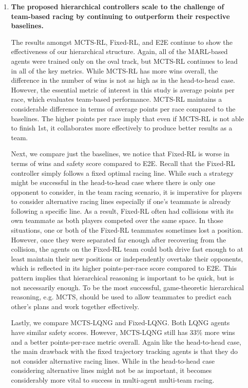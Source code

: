 \begin{enumerate}[wide, labelindent=0pt, font=\bfseries]
\item \textbf{The proposed hierarchical controllers scale to the challenge of team-based racing by continuing to outperform their respective baselines.} 

The results amongst MCTS-RL, Fixed-RL, and E2E continue to show the effectiveness of our hierarchical structure. Again, all of the MARL-based agents were trained only on the oval track, but MCTS-RL continues to lead in all of the key metrics. While MCTS-RL has more wins overall, the difference in the number of wins is not as high as in the head-to-head case. However, the essential metric of interest in this study is average points per race, which evaluates team-based performance. MCTS-RL maintains a considerable difference in terms of average points per race compared to the baselines. The higher points per race imply that even if MCTS-RL is not able to finish 1st, it collaborates more effectively to produce better results as a team. 

Next, we compare just the baselines, we notice that Fixed-RL is worse in terms of wins and safety score compared to E2E. Recall that the Fixed-RL controller simply follows a fixed optimal racing line. While such a strategy might be successful in the head-to-head case where there is only one opponent to consider, in the team racing scenario, it is imperative for players to consider alternative racing lines especially if one's teammate is already following a specific line. As a result, Fixed-RL often had collisions with its own teammate as both players competed over the same space. In those situations, one or both of the Fixed-RL teammates sometimes lost a position. However, once they were separated far enough after recovering from the collision, the agents on the Fixed-RL team could both drive fast enough to at least maintain their new positions or independently overtake their opponents, which is reflected in its higher points-per-race score compared to E2E. This pattern implies that hierarchical reasoning is important to be quick, but is not necessarily enough. To be the most successful, game-theoretic hierarchical reasoning, e.g. MCTS, should be used to allow teammates to predict each other's plans and work together effectively. 

Lastly, we compare MCTS-LQNG and Fixed-LQNG. Both LQNG agents have similar safety scores. However, MCTS-LQNG still has 33\% more wins and a better points-per-race metric overall. Again like the head-to-head case, the main drawback with the fixed trajectory tracking agents is that they do not consider alternative racing lines. While in the head-to-head case considering alternative lines might not be as important, it becomes considerably more vital to success in multi-agent multi-team racing.


\end{enumerate}
